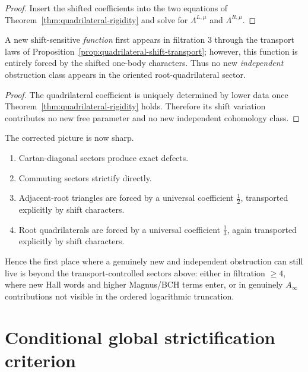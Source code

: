 \begin{proof}
Insert the shifted coefficients into the two equations of
Theorem~\ref{thm:quadrilateral-rigidity} and solve for
$\Lambda^{L,\mu}$ and $\Lambda^{R,\mu}$.
\end{proof}

\begin{corollary}
\ClaimStatusProvedHere
\label{cor:no-new-filtration3-shift-obstruction}
A new shift-sensitive \emph{function} first appears in filtration $3$
through the transport laws of
Proposition~\ref{prop:quadrilateral-shift-transport}; however, this
function is entirely forced by the shifted one-body characters. Thus no
new \emph{independent} obstruction class appears in the oriented
root-quadrilateral sector.
\end{corollary}

\begin{proof}
The quadrilateral coefficient is uniquely determined by lower data once
Theorem~\ref{thm:quadrilateral-rigidity} holds. Therefore its shift
variation contributes no new free parameter and no new independent
cohomology class.
\end{proof}

\begin{remark}
The corrected picture is now sharp.
\begin{enumerate}
\item Cartan-diagonal sectors produce exact defects.
\item Commuting sectors strictify directly.
\item Adjacent-root triangles are forced by a universal coefficient
 $\frac12$, transported explicitly by shift characters.
\item Root quadrilaterals are forced by a universal coefficient
 $\frac13$, again transported explicitly by shift characters.
\end{enumerate}
Hence the first place where a genuinely new and independent obstruction
can still live is beyond the transport-controlled sectors above:
either in filtration $\ge 4$, where new Hall words and higher Magnus/BCH
terms enter, or in genuinely $A_\infty$ contributions not visible in the
ordered logarithmic truncation.
\end{remark}

\section{Conditional global strictification criterion}

